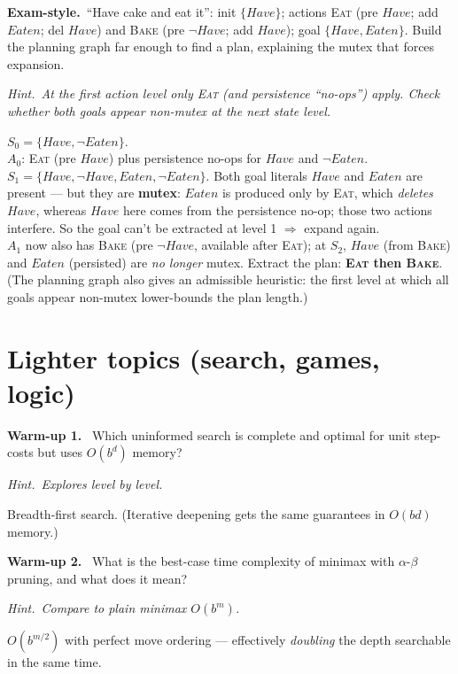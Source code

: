 \documentclass[11pt,a4paper]{article}
\newcommand{\hint}[1]{\par{\small\textcolor{accent}{\textit{Hint.}}\ \textit{#1}}\par\smallskip}
\newcommand{\warm}[1]{\smallskip\textbf{\textcolor{hi}{Warm-up #1.}}\ }
\newcommand{\exam}{\smallskip\textbf{\textcolor{warn}{Exam-style.}}\ }
\begin{document}
\exam ``Have cake and eat it'': init $\{\mathit{Have}\}$; actions \textsc{Eat} (pre $\mathit{Have}$; add $\mathit{Eaten}$; del $\mathit{Have}$) and \textsc{Bake} (pre $\neg\mathit{Have}$; add $\mathit{Have}$); goal $\{\mathit{Have},\mathit{Eaten}\}$. Build the planning graph far enough to find a plan, explaining the mutex that forces expansion.
\hint{At the first action level only \textsc{Eat} (and persistence ``no-ops'') apply. Check whether both goals appear \emph{non-mutex} at the next state level.}
\begin{sol}
$S_0=\{\mathit{Have},\neg\mathit{Eaten}\}$. \\
$A_0$: \textsc{Eat} (pre $\mathit{Have}$) plus persistence no-ops for $\mathit{Have}$ and $\neg\mathit{Eaten}$. \\
$S_1=\{\mathit{Have},\neg\mathit{Have},\mathit{Eaten},\neg\mathit{Eaten}\}$. Both goal literals $\mathit{Have}$ and $\mathit{Eaten}$ are present --- but they are \textbf{mutex}: $\mathit{Eaten}$ is produced only by \textsc{Eat}, which \emph{deletes} $\mathit{Have}$, whereas $\mathit{Have}$ here comes from the persistence no-op; those two actions interfere. So the goal can't be extracted at level 1 $\Rightarrow$ expand again.\\
$A_1$ now also has \textsc{Bake} (pre $\neg\mathit{Have}$, available after \textsc{Eat}); at $S_2$, $\mathit{Have}$ (from \textsc{Bake}) and $\mathit{Eaten}$ (persisted) are \emph{no longer} mutex. Extract the plan: \textbf{\textsc{Eat} then \textsc{Bake}}. (The planning graph also gives an admissible heuristic: the first level at which all goals appear non-mutex lower-bounds the plan length.)
\end{sol}

\section{Lighter topics (search, games, logic)}

\warm{1} Which uninformed search is complete and optimal for unit step-costs but uses $O(b^d)$ memory?
\hint{Explores level by level.}
\begin{sol}Breadth-first search. (Iterative deepening gets the same guarantees in $O(bd)$ memory.)\end{sol}

\warm{2} What is the best-case time complexity of minimax with $\alpha$-$\beta$ pruning, and what does it mean?
\hint{Compare to plain minimax $O(b^m)$.}
\begin{sol}$O(b^{m/2})$ with perfect move ordering --- effectively \emph{doubling} the depth searchable in the same time.\end{sol}
\end{document}
